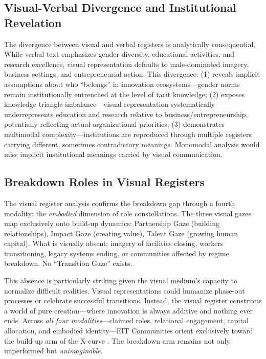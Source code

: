 \documentclass[../main.tex]{subfiles}
\begin{document}
\subsection{Visual-Verbal Divergence and Institutional Revelation}

The divergence between visual and verbal registers is analytically consequential. While verbal text emphasizes gender diversity, educational activities, and research excellence, visual representation defaults to male-dominated imagery, business settings, and entrepreneurial action. This divergence: (1) reveals implicit assumptions about who ``belongs'' in innovation ecosystems---gender norms remain institutionally entrenched at the level of tacit knowledge; (2) exposes knowledge triangle imbalance---visual representation systematically underrepresents education and research relative to business/entrepreneurship, potentially reflecting actual organizational priorities; (3) demonstrates multimodal complexity---institutions are reproduced through multiple registers carrying different, sometimes contradictory meanings. Monomodal analysis would miss implicit institutional meanings carried by visual communication.


\subsection{Breakdown Roles in Visual Registers}

The visual register analysis confirms the breakdown gap through a fourth modality: the \emph{embodied} dimension of role constellations. The three visual gazes map exclusively onto build-up dynamics: Partnership Gaze (building relationships), Impact Gaze (creating value), Talent Gaze (growing human capital). What is visually absent: imagery of facilities closing, workers transitioning, legacy systems ending, or communities affected by regime breakdown. No ``Transition Gaze'' exists.

This absence is particularly striking given the visual medium's capacity to normalize difficult realities. Visual representations could humanize phase-out processes or celebrate successful transitions. Instead, the visual register constructs a world of pure creation---where innovation is always additive and nothing ever ends. Across \emph{all four modalities}---claimed roles, relational engagement, capital allocation, and embodied identity---EIT Communities orient exclusively toward the build-up arm of the X-curve \parencite{hebinck2022xcurve}. The breakdown arm remains not only unperformed but \emph{unimaginable}.
\end{document}
